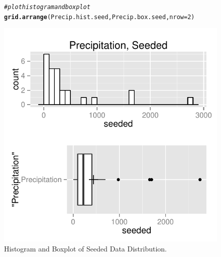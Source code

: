 \documentclass{article}\usepackage[]{graphicx}\usepackage[]{color}
\makeatletter
\def\maxwidth{ %
  \ifdim\Gin@nat@width>\linewidth
    \linewidth
  \else
    \Gin@nat@width
  \fi
}
\newcommand{\hlnum}[1]{\textcolor[rgb]{0.686,0.059,0.569}{#1}}%
\newcommand{\hlcom}[1]{\textcolor[rgb]{0.678,0.584,0.686}{\textit{#1}}}%
\newcommand{\hlstd}[1]{\textcolor[rgb]{0.345,0.345,0.345}{#1}}%
\newcommand{\hlkwc}[1]{\textcolor[rgb]{0.333,0.667,0.333}{#1}}%
\newcommand{\hlkwd}[1]{\textcolor[rgb]{0.737,0.353,0.396}{\textbf{#1}}}%
\newenvironment{kframe}{%
 \def\at@end@of@kframe{}%
 \ifinner\ifhmode%
  \def\at@end@of@kframe{\end{minipage}}%
  \begin{minipage}{\columnwidth}%
 \fi\fi%
 \def\FrameCommand##1{\hskip\@totalleftmargin \hskip-\fboxsep
 \colorbox{shadecolor}{##1}\hskip-\fboxsep
     \hskip-\linewidth \hskip-\@totalleftmargin \hskip\columnwidth}%
 \MakeFramed {\advance\hsize-\width
   \@totalleftmargin\z@ \linewidth\hsize
   \@setminipage}}%
 {\par\unskip\endMakeFramed%
 \at@end@of@kframe}
\newenvironment{knitrout}{}{} %
\makeatother
\begin{document}
\begin{figure}[H]  \begin{center}
\begin{knitrout}
\color{fgcolor}\begin{kframe}
\begin{alltt}
\hlcom{# plot histogram and boxplot}
\hlkwd{grid.arrange}\hlstd{(Precip.hist.seed, Precip.box.seed,} \hlkwc{nrow} \hlstd{=} \hlnum{2}\hlstd{)}
\end{alltt}
\end{kframe}
\includegraphics[width=\maxwidth]{figure/1a_data_seed_plot} 

\end{knitrout}
\end{center} \caption{Histogram and Boxplot of Seeded Data Distribution.} \end{figure}
\end{document}
